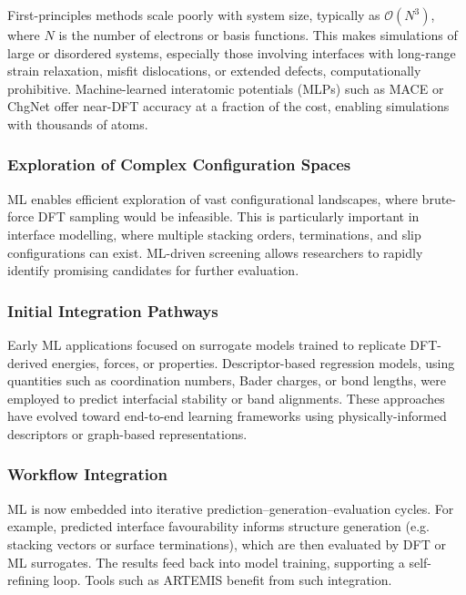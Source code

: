 First-principles methods scale poorly with system size, typically as \( \mathcal{O}(N^3) \), where \( N \) is the
number of electrons or basis functions. This makes simulations of large or disordered systems, especially those
involving interfaces with long-range strain relaxation, misfit dislocations, or extended defects, computationally
prohibitive. Machine-learned interatomic potentials (MLPs) such as MACE or ChgNet offer near-DFT accuracy at a fraction
of the cost, enabling simulations with thousands of atoms.

\subsubsection{Exploration of Complex Configuration Spaces}

ML enables efficient exploration of vast configurational landscapes, where brute-force DFT sampling would be
infeasible. This is particularly important in interface modelling, where multiple stacking orders, terminations, and
slip configurations can exist. ML-driven screening allows researchers to rapidly identify promising candidates for
further evaluation.

\subsubsection{Initial Integration Pathways}

Early ML applications focused on surrogate models trained to replicate DFT-derived energies, forces, or properties.
Descriptor-based regression models, using quantities such as coordination numbers, Bader charges, or bond lengths, were
employed to predict interfacial stability or band alignments. These approaches have evolved toward end-to-end learning
frameworks using physically-informed descriptors or graph-based representations.

\subsubsection{Workflow Integration}

ML is now embedded into iterative prediction--generation--evaluation cycles. For example, predicted interface
favourability informs structure generation (e.g. stacking vectors or surface terminations), which are then evaluated by
DFT or ML surrogates. The results feed back into model training, supporting a self-refining loop. Tools such as ARTEMIS
benefit from such integration.

